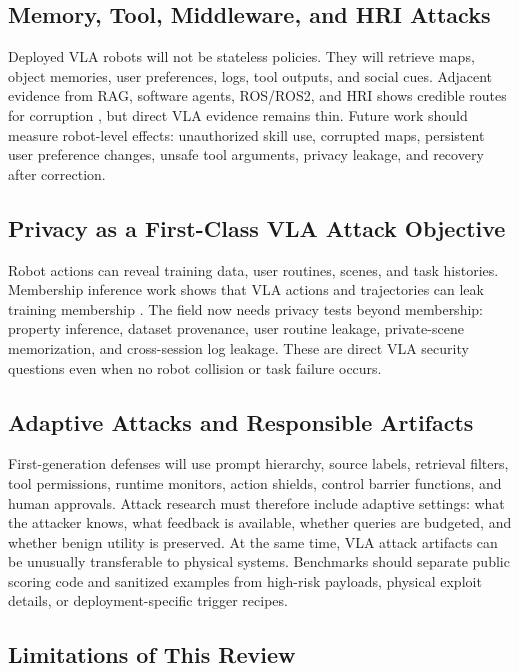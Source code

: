 \subsection{Memory, Tool, Middleware, and HRI Attacks}

Deployed VLA robots will not be stateless policies. They will retrieve maps, object memories, user preferences, logs, tool outputs, and social cues. Adjacent evidence from RAG, software agents, ROS/ROS2, and HRI shows credible routes for corruption \cite{zou2025poisonedrag,debenedetti2024agentdojo,deng2022insecurityros2,booth2017piggybacking}, but direct VLA evidence remains thin. Future work should measure robot-level effects: unauthorized skill use, corrupted maps, persistent user preference changes, unsafe tool arguments, privacy leakage, and recovery after correction.

\subsection{Privacy as a First-Class VLA Attack Objective}

Robot actions can reveal training data, user routines, scenes, and task histories. Membership inference work shows that VLA actions and trajectories can leak training membership \cite{peng2026miavla,luan2026vlaleaks}. The field now needs privacy tests beyond membership: property inference, dataset provenance, user routine leakage, private-scene memorization, and cross-session log leakage. These are direct VLA security questions even when no robot collision or task failure occurs.

\subsection{Adaptive Attacks and Responsible Artifacts}

First-generation defenses will use prompt hierarchy, source labels, retrieval filters, tool permissions, runtime monitors, action shields, control barrier functions, and human approvals. Attack research must therefore include adaptive settings: what the attacker knows, what feedback is available, whether queries are budgeted, and whether benign utility is preserved. At the same time, VLA attack artifacts can be unusually transferable to physical systems. Benchmarks should separate public scoring code and sanitized examples from high-risk payloads, physical exploit details, or deployment-specific trigger recipes.

\subsection{Limitations of This Review}

